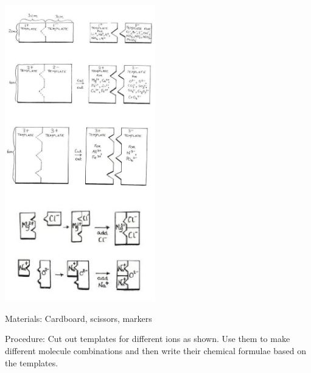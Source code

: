 \begin{multicols}{2}
\begin{center}
\includegraphics[width=0.49\textwidth]{./img/source/ion-templates.jpg}
\end{center}

\begin{description*}
\item[Materials:]{Cardboard, scissors, markers}
\item[Procedure:]{Cut out templates for different ions as shown. Use them to make different molecule combinations and then write their chemical formulae based on the templates.}
\end{description*}

\vfill
\columnbreak



\end{multicols}
